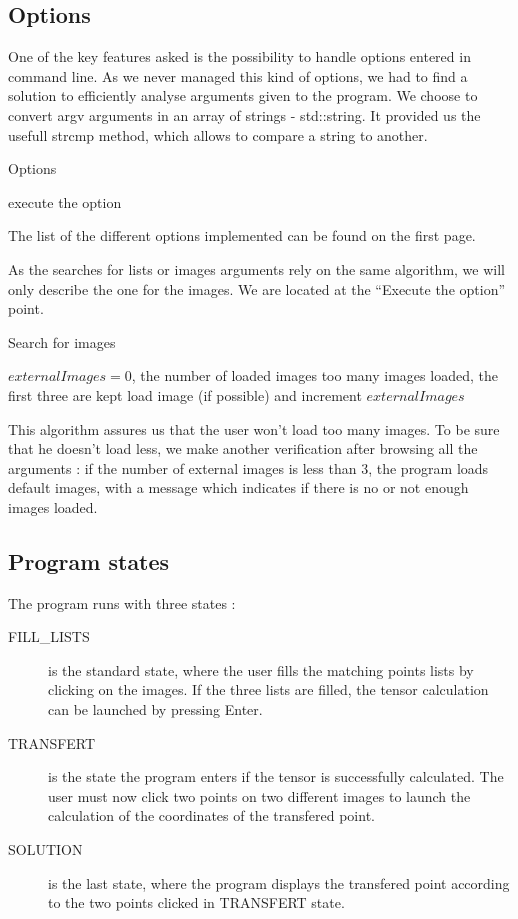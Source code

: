 \documentclass[a4paper,10pt]{report}
\begin{document}
\subsection{Options}
One of the key features asked is the possibility to handle options entered in command line. As we never 
managed this kind of options, we had to find a solution to efficiently analyse arguments given to the
program. We choose to convert argv arguments in an array of strings - std::string. It provided us the
usefull strcmp method, which allows to compare a string to another.

\begin{algorithm}
\caption{Options}
\begin{algorithmic}
\STATE execute the option
\ENDIF
\ENDFOR
\ENDFOR
\end{algorithmic}
\end{algorithm}

The list of the different options implemented can be found on the first page.

As the searches for lists or images arguments rely on the same algorithm, we will only describe the one
for the images. We are located at the ``Execute the option'' point.

\begin{algorithm}
\caption{Search for images}
\begin{algorithmic}
\REQUIRE $externalImages = 0$, the number of loaded images
\STATE too many images loaded, the first three are kept
\ELSE 
\STATE load image (if possible) and increment $externalImages$
\ENDIF
\ENDIF
\end{algorithmic}
\end{algorithm}

This algorithm assures us that the user won't load too many images.
To be sure that he doesn't load less, we make another verification after browsing all the arguments :
if the number of external images is less than 3, the program loads default images, with a message
which indicates if there is no or not enough images loaded.

\subsection{Program states}
The program runs with three states :
\begin{description}
 \item[FILL\_LISTS] is the standard state, where the user fills the matching points lists by clicking on the images.
 If the three lists are filled, the tensor calculation can be launched by pressing Enter.
 \item[TRANSFERT] is the state the program enters if the tensor is successfully calculated. The user must now
 click two points on two different images to launch the calculation of the coordinates of the
 transfered point.
 \item[SOLUTION] is the last state, where the program displays the transfered point according to the two points clicked 
 in TRANSFERT state.
\end{description}
\end{document}
